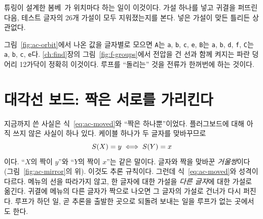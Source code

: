 튜링이 설계한 봄베~\cite{jackson-bh06,ellsbury1998bombe}가 위치마다 하는 일이 이것이다. 가설 하나를 넣고 귀결을
퍼뜨린 다음, 테스트 글자의 26개 가설이 모두 지워졌는지를 본다. 넣은 가설이 맞든 틀리든 상관없다.

\Ours 그림~\ref{fig:ac-orbit}에서 나온 값을 글자별로 모으면 \texttt{A}는 \texttt{a}, \texttt{b}, \texttt{c}, \texttt{e},
\texttt{B}는 \texttt{a}, \texttt{b}, \texttt{d}, \texttt{f}, \texttt{C}는 \texttt{a}, \texttt{b}, \texttt{c}, \texttt{e}다. \ref{ch:find}장의 그림~\ref{fig:f-groups}에서 전압을 건 선과
함께 켜지는 파란 덩어리 12가닥이 정확히 이것이다. 루프를 ``돌리는'' 것을 전류가 한꺼번에 하는 것이다.

\section{대각선 보드: 짝은 서로를 가리킨다}\label{sec:ac-diagonal}

지금까지 쓴 사실은 식~\eqref{eq:ac-moved}와 ``짝은 하나뿐''이었다. 플러그보드에 대해 아직 쓰지 않은 사실이 하나 있다.
케이블 하나가 두 글자를 맞바꾸므로
\begin{equation}
  S(X) = y \iff S(Y) = x \label{eq:ac-sym}
\end{equation}
이다. ``$X$의 짝이 $y$''와 ``$Y$의 짝이 $x$''는 같은 말이다. 글자와 짝을 맞바꾼 \emph{거울쌍}이다
(그림~\ref{fig:ac-mirror}의 위). 이것도 추론 규칙이다. 그런데 식~\eqref{eq:ac-moved}와 성격이 다르다. 메뉴의 선을
따라가지 않고, 한 글자에 대한 가설을 \emph{다른 글자}에 대한 가설로 옮긴다. 귀결에 메뉴의 다른 글자가 짝으로 나오면
그 글자의 가설로 건너가 다시 퍼진다. 루프가 하던 일, 곧 추론을 출발한 곳으로 되돌려 보내는 일을 루프가 없는 곳에서도
한다.


